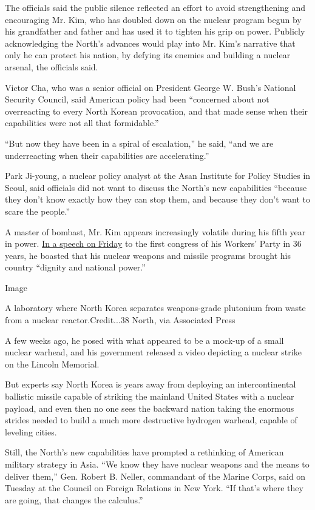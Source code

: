 The officials said the public silence reflected an effort to avoid
strengthening and encouraging Mr. Kim, who has doubled down on the
nuclear program begun by his grandfather and father and has used it to
tighten his grip on power. Publicly acknowledging the North's advances
would play into Mr. Kim's narrative that only he can protect his nation,
by defying its enemies and building a nuclear arsenal, the officials
said.

Victor Cha, who was a senior official on President George W. Bush's
National Security Council, said American policy had been ``concerned
about not overreacting to every North Korean provocation, and that made
sense when their capabilities were not all that formidable.''

``But now they have been in a spiral of escalation,'' he said, ``and we
are underreacting when their capabilities are accelerating.''

Park Ji-young, a nuclear policy analyst at the Asan Institute for Policy
Studies in Seoul, said officials did not want to discuss the North's new
capabilities ``because they don't know exactly how they can stop them,
and because they don't want to scare the people.''

A master of bombast, Mr. Kim appears increasingly volatile during his
fifth year in power.
\href{http://www.nytimes.com/2016/05/07/world/asia/north-korea-congress.html?_r=0}{In
a speech on Friday} to the first congress of his Workers' Party in 36
years, he boasted that his nuclear weapons and missile programs brought
his country ``dignity and national power.''

Image

A laboratory where North Korea separates weapons-grade plutonium from
waste from a nuclear reactor.Credit...38 North, via Associated Press

A few weeks ago, he posed with what appeared to be a mock-up of a small
nuclear warhead, and his government released a video depicting a nuclear
strike on the Lincoln Memorial.

But experts say North Korea is years away from deploying an
intercontinental ballistic missile capable of striking the mainland
United States with a nuclear payload, and even then no one sees the
backward nation taking the enormous strides needed to build a much more
destructive hydrogen warhead, capable of leveling cities.

Still, the North's new capabilities have prompted a rethinking of
American military strategy in Asia. ``We know they have nuclear weapons
and the means to deliver them,'' Gen. Robert B. Neller, commandant of
the Marine Corps, said on Tuesday at the Council on Foreign Relations in
New York. ``If that's where they are going, that changes the calculus.''

